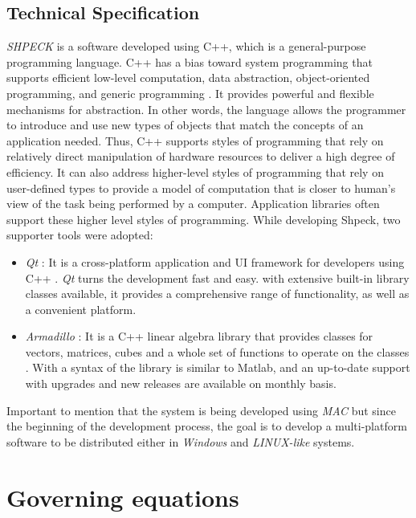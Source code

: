\subsection{Technical Specification}
\emph{SHPECK} is a software developed using C++, which is a general-purpose programming language. C++ has a bias toward system programming that supports efficient low-level computation, data abstraction, object-oriented programming, and generic programming \cite{Dale:04} \cite{Stroustrup:97}. It provides powerful and flexible mechanisms for abstraction. In other words, the language allows the programmer to introduce and use new types of objects that match the concepts of an application needed. Thus, C++ supports styles of programming that rely on relatively direct manipulation of hardware resources to deliver a high degree of efficiency. It can also address higher-level styles of programming that rely on user-defined types to provide a model of computation that is closer to human's view of the task being performed by a computer. Application libraries often support these higher level styles of programming. While developing Shpeck, two supporter tools were adopted:
\begin{itemize}
\item \emph{Qt} : It is a cross-platform application and UI framework for developers using C++  \cite{Qt:14}. \emph{Qt} turns the development fast and easy. with extensive built-in library classes available, it provides a comprehensive range of functionality, as well as a convenient platform.
\item \emph{Armadillo} : It is a C++ linear algebra library that provides classes for vectors, matrices, cubes and a whole set of functions to operate on the classes \cite{arma:14}. With a syntax of the library is similar to Matlab, and an up-to-date support with upgrades and new releases are available  on monthly basis.
\end{itemize}
Important to mention that the system is being developed using \emph{MAC} but since the beginning of the development process, the goal is to develop a multi-platform software to be distributed either in \emph{Windows} and \emph{LINUX-like} systems.

\section{Governing equations}

